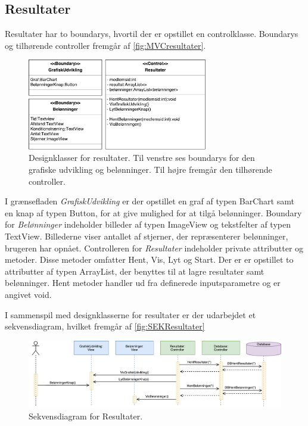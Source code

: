 \subsection*{Resultater}
Resultater har to boundarys, hvortil der er opstillet en controlklasse. Boundarys og tilhørende controller fremgår af \autoref{fig:MVCresultater}. 

\begin{figure} [H]
\centering
\includegraphics[width=0.7\textwidth]{figures/MVC/MVCResultater}
\caption{Designklasser for resultater. Til venstre ses boundarys for den grafiske udvikling og belønninger. Til højre fremgår den tilhørende controller.}
\label{fig:MVCresultater}
\end{figure}

\noindent
I grænsefladen \textit{GrafiskUdvikling} er der opstillet en graf af typen BarChart samt en knap af typen Button, for at give mulighed for at tilgå belønninger. Boundary for \textit{Belønninger} indeholder billeder af typen ImageView og tekstfelter af typen TextView. Billederne viser antallet af stjerner, der repræsenterer belønninger, brugeren har opnået.
Controlleren for \textit{Resultater} indeholder private attributter og metoder. Disse metoder omfatter Hent, Vis, Lyt og Start. Der er er opstillet to attributter af typen ArrayList, der benyttes til at lagre resultater samt belønninger. Hent metoder handler ud fra definerede inputsparametre og er angivet void. 

I sammenspil med designklasserne for resultater er der udarbejdet et sekvensdiagram, hvilket fremgår af \autoref{fig:SEKResultater}

\begin{figure} [H]
\centering
\includegraphics[width=1\textwidth]{figures/Sek/SEKResultater}
\caption{Sekvensdiagram for Resultater.}
\label{fig:SEKResultater}
\end{figure} 

